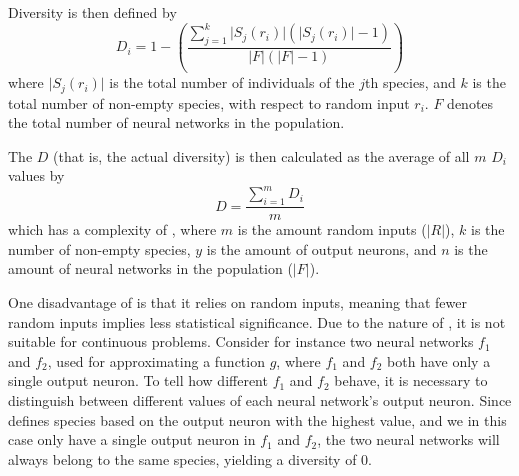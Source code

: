 Diversity is then defined by
%
\begin{equation*}\label{eq:sdi}
  D_i = 1 - \left(\frac{\sum_{j=1}^{k}\lvert S_j\left(r_i\right)\rvert\left(\lvert S_j\left(r_i\right)\rvert - 1\right)}{\lvert F\rvert \left(\lvert F\rvert - 1\right)}\right) 
\end{equation*}
%
where $\lvert S_j\left(r_i\right)\rvert$ is the total number of individuals of the $j$th species, and $k$ is the total number of non-empty species, with respect to random input $r_i$. %
$F$ denotes the total number of neural networks in the population. 

The \dia{} $D$ (that is, the actual diversity) is then calculated as the average of all $m$ $D_i$ values by
%
\[
D =\frac{\sum_{i=1}^m{D_i}}{m}
\]
%
which has a complexity of , where $m$ is the amount random inputs ($\lvert R \rvert$), $k$ is the number of non-empty species, $y$ is the amount of output neurons, and $n$ is the amount of neural networks in the population ($\lvert F\rvert$).

One disadvantage of \dia{} is that it relies on random inputs, meaning that fewer random inputs implies less statistical significance. Due to the nature of \dia, it is not suitable for continuous problems. Consider for instance two neural networks $f_1$ and $f_2$, used for approximating a function $g$, where $f_1$ and $f_2$ both have only a single output neuron. To tell how different $f_1$ and $f_2$ behave, it is necessary to distinguish between different values of each neural network's output neuron. Since \dia{} defines species based on the output neuron with the highest value, and we in this case only have a single output neuron in $f_1$ and $f_2$, the two neural networks will always belong to the same species, yielding a diversity of 0.  
